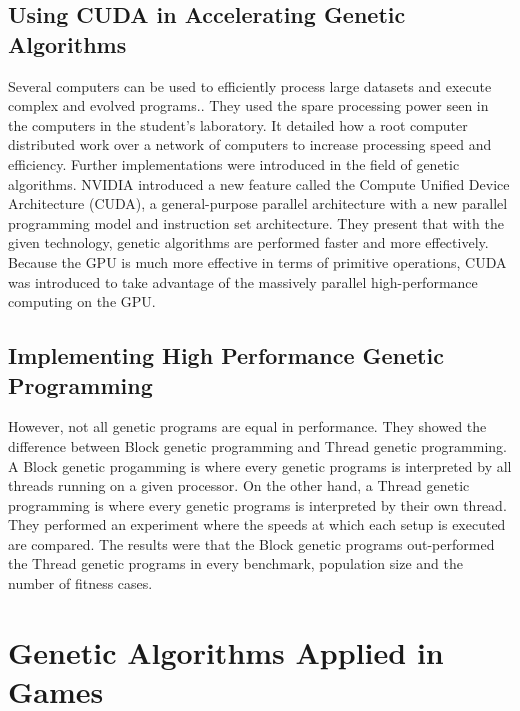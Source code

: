 \subsection{Using CUDA in Accelerating Genetic Algorithms}
Several computers can be used to efficiently process large datasets and execute complex
and evolved programs.\cite{Harding09}. They used the spare processing power seen in the
computers in the student's laboratory. It detailed how a root computer distributed work
over a network of computers to increase processing speed and efficiency. Further
implementations were introduced in the field of genetic algorithms. NVIDIA introduced a new 
feature called the Compute Unified Device Architecture (CUDA),
a general-purpose parallel architecture with a new parallel programming model and instruction
set architecture\cite{Zhang09}. They present that with the given technology, genetic algorithms
are performed faster and more effectively. Because the GPU is much more effective in terms of primitive
operations, CUDA was introduced to take advantage of the massively parallel high-performance
computing on the GPU.  

\subsection{Implementing High Performance Genetic Programming}
However, not all genetic programs are equal in performance. They showed the difference between
Block genetic programming and Thread genetic programming\cite{Robbilliard09}. A Block
genetic progamming is where every genetic programs is interpreted by all threads running
on a given processor. On the other hand, a Thread genetic programming is where every genetic
programs is interpreted by their own thread. They performed an experiment where
the speeds at which each setup is executed are compared. The results were that the Block genetic
programs out-performed the Thread genetic programs in every benchmark, population size and
the number of fitness cases.

\section{Genetic Algorithms Applied in Games}
